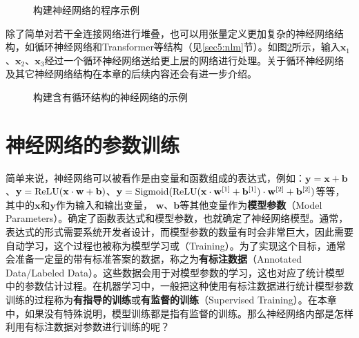 \begin{figure}[htp]
\centering

\caption{构建神经网络的程序示例}
\label{fig:5-39}
\end{figure}

\parinterval 除了简单对若干全连接网络进行堆叠，也可以用张量定义更加复杂的神经网络结构，如循环神经网络和Transformer等结构（见\ref{sec5:nlm}节）。如图\ref{fig:5-41}所示，输入$ \mathbf x_1 $、$ \mathbf x_2 $、$ \mathbf x_3 $经过一个循环神经网络送给更上层的网络进行处理。关于循环神经网络及其它神经网络结构在本章的后续内容还会有进一步介绍。

\begin{figure}[htp]
\centering

\caption{构建含有循环结构的神经网络的示例}
\label{fig:5-41}
\end{figure}


\sectionnewpage
\section{神经网络的参数训练}

\parinterval 简单来说，神经网络可以被看作是由变量和函数组成的表达式，例如：$ \mathbf y=\mathbf x+\mathbf b $、$ \mathbf y={\rm{ReLU}}(\mathbf x\cdot \mathbf w+\mathbf b) $、$ \mathbf y={\rm{Sigmoid}}({\rm{ReLU}}(\mathbf x\cdot \mathbf w^{[1]}+\mathbf b^{[1]})\cdot \mathbf w^{[2]}+\mathbf b^{[2]}) $等等，其中的$ \mathbf x $和$ \mathbf y $作为输入和输出变量， $ \mathbf w $、$ \mathbf b $等其他变量作为{\small\sffamily\bfseries{模型参数}}（Model Parameters）。确定了函数表达式和模型参数，也就确定了神经网络模型。通常，表达式的形式需要系统开发者设计，而模型参数的数量有时会非常巨大，因此需要自动学习，这个过程也被称为模型学习或{\small{}}（Training）。为了实现这个目标，通常会准备一定量的带有标准答案的数据，称之为{\small\sffamily\bfseries{有标注数据}}（Annotated Data/Labeled Data）。这些数据会用于对模型参数的学习，这也对应了统计模型中的参数估计过程。在机器学习中，一般把这种使用有标注数据进行统计模型参数训练的过程称为{\small\sffamily\bfseries{有指导的训练}}或{\small\sffamily\bfseries{有监督的训练}}（Supervised Training）。在本章中，如果没有特殊说明，模型训练都是指有监督的训练。那么神经网络内部是怎样利用有标注数据对参数进行训练的呢？\\ \\

